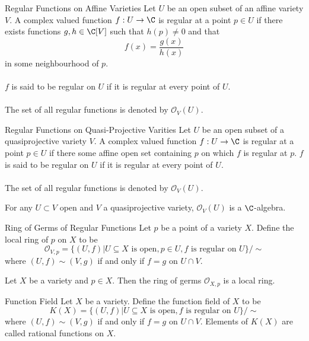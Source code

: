 \documentclass[a4paper]{article}
\begin{document}
\begin{defn}{Regular Functions on Affine Varieties}{} Let $U$ be an open subset of an affine variety $V$. A complex valued function $f:U\to\C$ is regular at a point $p\in U$ if there exists functions $g,h\in\C[V]$ such that $h(p)\neq 0$ and that $$f(x)=\frac{g(x)}{h(x)}$$ in some neighbourhood of $p$. \\~\\
$f$ is said to be regular on $U$ if it is regular at every point of $U$. \\~\\
The set of all regular functions is denoted by $\mathcal{O}_V(U)$. 
\end{defn}

\begin{defn}{Regular Functions on Quasi-Projective Varities}{} Let $U$ be an open subset of a quasiprojective variety $V$. A complex valued function $f:U\to\C$ is regular at a point $p\in U$ if there some affine open set containing $p$ on which $f$ is regular at $p$. 
$f$ is said to be regular on $U$ if it is regular at every point of $U$. \\~\\
The set of all regular functions is denoted by $\mathcal{O}_V(U)$. 
\end{defn}

\begin{lmm}{}{} For any $U\subset V$ open and $V$ a quasiprojective variety, $\mathcal{O}_V(U)$ is a $\C$-algebra. 
\end{lmm}

\begin{defn}{Ring of Germs of Regular Functions}{} Let $p$ be a point of a variety $X$. Define the local ring of $p$ on $X$ to be $$\mathcal{O}_{V,p}=\{(U,f)|U\subseteq X\text{ is open}, p\in U, f\text{ is regular on }U\}/\sim$$ where $(U,f)\sim(V,g)$ if and only if $f=g$ on $U\cap V$. 
\end{defn}

\begin{prp}{}{} Let $X$ be a variety and $p\in X$. Then the ring of germs $\mathcal{O}_{X,p}$ is a local ring. 
\end{prp}

\begin{defn}{Function Field}{} Let $X$ be a variety. Define the function field of $X$ to be $$K(X)=\{(U,f)|U\subseteq X\text{ is open}, f\text{ is regular on }U\}/\sim$$ where $(U,f)\sim(V,g)$ if and only if $f=g$ on $U\cap V$. Elements of $K(X)$ are called rational functions on $X$. 
\end{defn}
\end{document}
